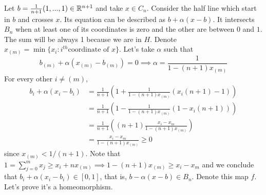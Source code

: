 Let $b = \frac{1}{n+1}(1,...,1) \in \mathbb{R}^{n+1}$ and take $x \in C_n$. Consider
the half line which start in $b$ and crosses $x$. Its equation can be
described as $b + \alpha(x - b)$. It intersects $B_n$ when at least one of its
coordinates is zero and the other are between $0$ and $1$. The sum will be
always 1 because we are in $H$. Denote $x_{(m)} = \min\{x_i : i^{th}
\text{coordinate of } x\}$. Let's take $\alpha$ such that 
$$
b_{(m)} + \alpha(x_{(m)} - b_{(m)}) = 0 \implies \alpha = \frac{1}{1 - (n+1)x_{(m)}}
$$
For every other $i \neq (m)$, 
\begin{equation*}
    \begin{split}
        b_i + \alpha(x_i - b_i) &= \frac{1}{n+1}\left(1 + \frac{1}{1 - (n+1)x_{(m)}}(x_i(n+1) - 1)\right) \\
        &= \frac{1}{n+1}\left(1 - \frac{1}{1 - (n+1)x_{(m)}}(1 - x_i(n+1))\right) \\
        &= \frac{1}{n+1}\left((n+1)\frac{x_i - x_{m}}{1 - (n+1)x_{(m)}}\right) \\
        &= \frac{x_i - x_{m}}{1 - (n+1)x_{(m)}} \ge 0
    \end{split}
\end{equation*}
since $x_{(m)} < 1/(n+1)$. Note that $1 = \sum_{j=0}^m x_j \ge x_i + nx_{(m)}
\implies 1 - (n+1)x_{(m)} \ge x_i - x_m$ and we conclude that $b_i +
\alpha(x_i - b_i) \in [0,1]$, that is, $b - \alpha(x - b) \in B_n$. Denote
this map $f$. Let's prove it's a homeomorphism. 

